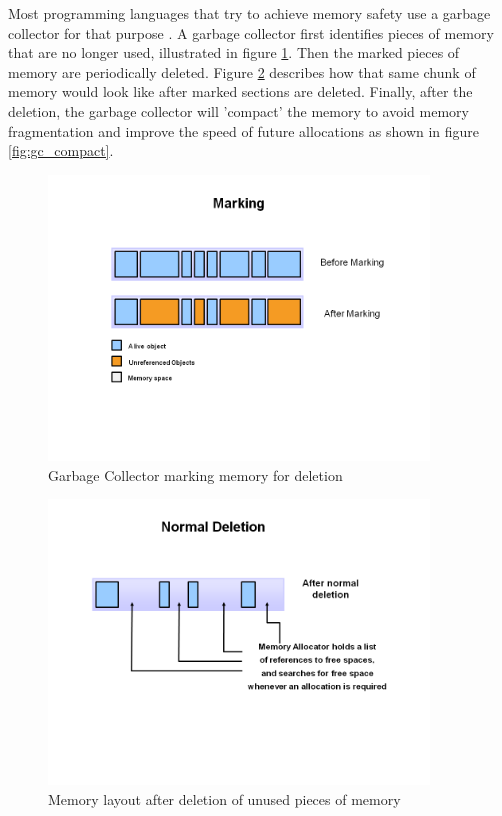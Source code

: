 Most programming languages that try to achieve memory safety use a garbage collector for that purpose \cite{java_garbage_collector}.
A garbage collector first identifies pieces of memory that are no longer used, illustrated in figure \ref{fig:gc_mark}.
Then the marked pieces of memory are periodically deleted. Figure \ref{fig:gc_delete} describes how that same chunk of memory would look like after marked sections are deleted.
Finally, after the deletion, the garbage collector will 'compact' the memory to avoid memory fragmentation and improve the speed of future allocations as shown in figure \ref{fig:gc_compact}.

\begin{figure}[htb]
    \centering
    \includegraphics[width=0.9\textwidth]{figures/fundamentals_garbage_collector_marking.PNG}
    \caption[Illustration: Garbage Collector marking memory for deletion \cite{java_garbage_collector}]{Garbage Collector marking memory for deletion}
    \label{fig:gc_mark}
\end{figure}

\begin{figure}[htb]
    \centering
    \includegraphics[width=0.9\textwidth]{figures/fundamentals_garbage_collector_deletion.PNG}
    \caption[Illustration: Garbage Collector deleting marked memory \cite{java_garbage_collector}]{Memory layout after deletion of unused pieces of memory}
    \label{fig:gc_delete}
\end{figure}

